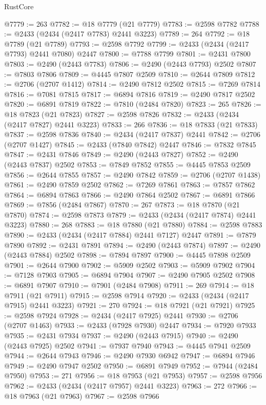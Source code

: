 \begin{lexlean}{RustCore}
\begin{coremodule}
@7779 := 263
@7782 := @18 @7779 (@21 @7779)
@7783 := @2598 @7782
@7788 := @2433 (@2434 (@2417 @7783) @2441 @3223)
@7789 := 264
@7792 := @18 @7789 (@21 @7789)
@7793 := @2598 @7792
@7799 := @2433 (@2434 (@2417 @7793) @2441 @7080) @2447
@7800 := @7788 @7799
@7801 := @2431 @7800
@7803 := @2490 (@2443 @7783)
@7806 := @2490 (@2443 @7793) @2502
@7807 := @7803 @7806
@7809 := @4445 @7807 @2509
@7810 := @2644 @7809
@7812 := @2706 (@2707 @1412)
@7814 := @2490 @7812 @2502
@7815 := @7269 @7814
@7816 := @7081 @7815
@7817 := @6894 @7816
@7819 := @2490 @7817 @2502
@7820 := @6891 @7819
@7822 := @7810 (@2484 @7820)
@7823 := 265
@7826 := @18 @7823 (@21 @7823)
@7827 := @2598 @7826
@7832 := @2433 (@2434 (@2417 @7827) @2441 @3223)
@7833 := 266
@7836 := @18 @7833 (@21 @7833)
@7837 := @2598 @7836
@7840 := @2434 (@2417 @7837) @2441
@7842 := @2706 (@2707 @1427)
@7845 := @2433 (@7840 @7842) @2447
@7846 := @7832 @7845
@7847 := @2431 @7846
@7849 := @2490 (@2443 @7827)
@7852 := @2490 (@2443 @7837) @2502
@7853 := @7849 @7852
@7855 := @4445 @7853 @2509
@7856 := @2644 @7855
@7857 := @2490 @7842
@7859 := @2706 (@2707 @1438)
@7861 := @2490 @7859 @2502
@7862 := @7269 @7861
@7863 := @7857 @7862
@7864 := @6894 @7863
@7866 := @2490 @7864 @2502
@7867 := @6891 @7866
@7869 := @7856 (@2484 @7867)
@7870 := 267
@7873 := @18 @7870 (@21 @7870)
@7874 := @2598 @7873
@7879 := @2433 (@2434 (@2417 @7874) @2441 @3223)
@7880 := 268
@7883 := @18 @7880 (@21 @7880)
@7884 := @2598 @7883
@7890 := @2433 (@2434 (@2417 @7884) @2441 @7127) @2447
@7891 := @7879 @7890
@7892 := @2431 @7891
@7894 := @2490 (@2443 @7874)
@7897 := @2490 (@2443 @7884) @2502
@7898 := @7894 @7897
@7900 := @4445 @7898 @2509
@7901 := @2644 @7900
@7902 := @5909 @2502
@7903 := @5909 @7902
@7904 := @7128 @7903
@7905 := @6894 @7904
@7907 := @2490 @7905 @2502
@7908 := @6891 @7907
@7910 := @7901 (@2484 @7908)
@7911 := 269
@7914 := @18 @7911 (@21 @7911)
@7915 := @2598 @7914
@7920 := @2433 (@2434 (@2417 @7915) @2441 @3223)
@7921 := 270
@7924 := @18 @7921 (@21 @7921)
@7925 := @2598 @7924
@7928 := @2434 (@2417 @7925) @2441
@7930 := @2706 (@2707 @1463)
@7933 := @2433 (@7928 @7930) @2447
@7934 := @7920 @7933
@7935 := @2431 @7934
@7937 := @2490 (@2443 @7915)
@7940 := @2490 (@2443 @7925) @2502
@7941 := @7937 @7940
@7943 := @4445 @7941 @2509
@7944 := @2644 @7943
@7946 := @2490 @7930 @6942
@7947 := @6894 @7946
@7949 := @2490 @7947 @2502
@7950 := @6891 @7949
@7952 := @7944 (@2484 @7950)
@7953 := 271
@7956 := @18 @7953 (@21 @7953)
@7957 := @2598 @7956
@7962 := @2433 (@2434 (@2417 @7957) @2441 @3223)
@7963 := 272
@7966 := @18 @7963 (@21 @7963)
@7967 := @2598 @7966

\end{coremodule}
\end{lexlean}
